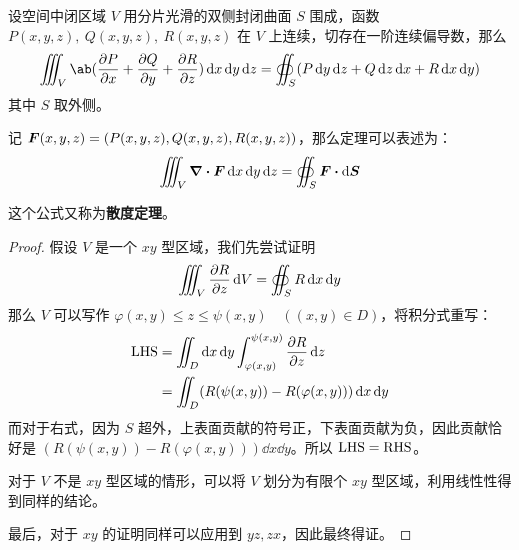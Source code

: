 \begin{theorem}[Gauss 公式]
	设空间中闭区域 $V$ 用分片光滑的双侧封闭曲面 $S$ 围成，函数 $P(x, y, z),\ Q(x, y, z),\ R(x, y, z)$ 在 $V$ 上连续，切存在一阶连续偏导数，那么
	$$
	\iiint_V \ab(\pdv{P}{x} + \pdv{Q}{y} + \pdv{R}{z}) \dd{x} \dd{y} \dd{z} = \oiint_S (P \dd{y} \dd{z} + Q \dd{z} \dd{x} + R \dd{x} \dd{y})
	$$
	其中 $S$ 取外侧。
	
	记 $\boldsymbol{F}(x, y, z) = (P(x, y, z), Q(x, y, z), R(x, y, z))$，那么定理可以表述为：
	$$
	\iiint_V \div \vect{F} \dd{x} \dd{y} \dd{z} = \oiint_S \vect{F} \vdot \dd{\vect{S}}
	$$

	这个公式又称为\textbf{散度定理}。

	\begin{proof}
		假设 $V$ 是一个 $xy$ 型区域，我们先尝试证明
		$$
		\iiint_V \pdv{R}{z} \dd{V} = \oiint_S R \dd{x} \dd{y}
		$$
		那么 $V$ 可以写作 $\varphi(x, y) \le z \le \psi(x, y) \quad ((x, y) \in D)$，将积分式重写：
		$$
		\begin{aligned}
			\text{LHS} & = \iint_D \dd{x} \dd{y} \int_{\varphi(x, y)}^{\psi(x, y)} \pdv{R}{z} \dd{z} \\
			& = \iint_D (R(\psi(x, y)) - R(\varphi(x, y))) \dd{x} \dd{y} \\
		\end{aligned}
		$$
		而对于右式，因为 $S$ 超外，上表面贡献的符号正，下表面贡献为负，因此贡献恰好是 $(R(\psi(x, y)) - R(\varphi(x, y))) \dd{x} \dd{y}$。所以 $\text{LHS} = \text{RHS}$。

		对于 $V$ 不是 $xy$ 型区域的情形，可以将 $V$ 划分为有限个 $xy$ 型区域，利用线性性得到同样的结论。

		最后，对于 $xy$ 的证明同样可以应用到 $yz, zx$，因此最终得证。
	\end{proof}
\end{theorem}